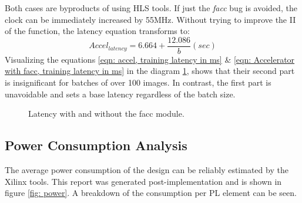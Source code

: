 Both cases are byproducts of using HLS tools. If just the \textit{facc} bug is avoided, the clock can be immediately increased by 55MHz. Without trying to improve the II of the function, the latency equation transforms to: %
\begin{equation}
    Accel_{latency} = 6.664 + \frac{ 12.086 }{b} (sec) %
    \label{eqn: Accelerator with facc, training latency in ms}
\end{equation}
Visualizing the equations \ref{eqn: accel, training latency in ms} \& \ref{eqn: Accelerator with facc, training latency in ms} in the diagram \ref{fig: accel latency}, shows that their second part is insignificant for batches of over 100 images. In contrast, the first part is unavoidable and sets a base latency regardless of the batch size. %
\begin{figure}[H]
    \center
    \caption[Accelerator's latency per batch size]{Latency with and without the facc module.}
    \label{fig: accel latency}
\end{figure}

\subsection{Power Consumption Analysis}
The average power consumption of the design can be reliably estimated by the Xilinx tools. This report was generated post-implementation and is shown in figure \ref{fig: power}. A breakdown of the consumption per PL element can be seen.

